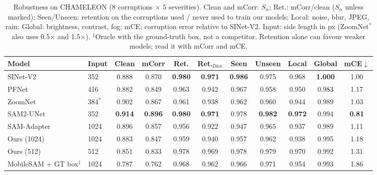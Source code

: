\begin{table}[t]
\centering
\caption{Robustness on CHAMELEON (8 corruptions $\times$ 5 severities). Clean and mCorr: $S_\alpha$; Ret.: mCorr/clean ($S_\alpha$ unless marked); Seen/Unseen: retention on the corruptions used / never used to train our models; Local: noise, blur, JPEG, rain; Global: brightness, contrast, fog; mCE: corruption error relative to SINet-V2. Input: side length in px (ZoomNet$^*$ also uses 0.5$\times$ and 1.5$\times$). $^\ddagger$Oracle with the ground-truth box, not a competitor. Retention alone can favour weaker models; read it with mCorr and mCE.}
\label{tab:robust-chameleon}
\footnotesize
\begin{tabular}{llccccccccc}
\toprule
Model & Input & Clean & mCorr & Ret. & Ret.$_{\mathrm{Dice}}$ & Seen & Unseen & Local & Global & mCE$\downarrow$ \\
\midrule
SINet-V2 & 352 & 0.888 & 0.870 & \textbf{0.980} & \textbf{0.971} & \textbf{0.986} & 0.975 & 0.968 & \textbf{1.000} & 1.00 \\
PFNet & 416 & 0.882 & 0.849 & 0.963 & 0.942 & 0.967 & 0.958 & 0.950 & 0.983 & 1.17 \\
ZoomNet & 384$^*$ & 0.902 & 0.867 & 0.961 & 0.938 & 0.962 & 0.960 & 0.944 & 0.989 & 1.03 \\
\midrule
SAM2-UNet & 352 & \textbf{0.914} & \textbf{0.896} & \textbf{0.980} & \textbf{0.971} & 0.978 & \textbf{0.982} & \textbf{0.972} & 0.994 & \textbf{0.81} \\
SAM-Adapter & 1024 & 0.896 & 0.857 & 0.956 & 0.922 & 0.947 & 0.965 & 0.937 & 0.989 & 1.11 \\
\midrule
Ours (1024) & 1024 & 0.883 & 0.847 & 0.959 & 0.940 & 0.957 & 0.962 & 0.938 & 0.995 & 1.18 \\
Ours (512) & 512 & 0.851 & 0.833 & 0.978 & 0.969 & 0.978 & 0.979 & 0.970 & 0.992 & 1.31 \\
\midrule
MobileSAM + GT box$^\ddagger$ & 1024 & 0.787 & 0.762 & 0.968 & 0.962 & 0.966 & 0.971 & 0.954 & 0.993 & 1.86 \\
\bottomrule
\end{tabular}
\end{table}
